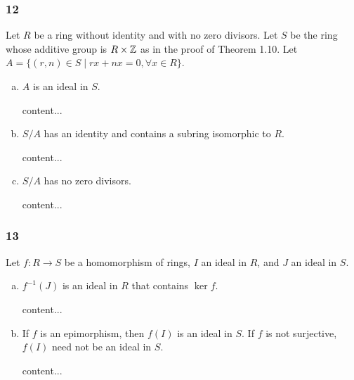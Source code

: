 \subsubsection*{12}
\begin{graybox}
	Let $R$ be a ring without identity and with no zero divisors. Let $S$ be the ring whose additive group is $R \times \mathbb{Z}$ as in the proof of Theorem 1.10. Let $A = \{(r,n) \in S \mid rx + nx = 0, \forall x \in R\}$.
\end{graybox}
\begin{enumerate}[(a)]
	\item
	\begin{lightgraybox}
		$A$ is an ideal in $S$.
	\end{lightgraybox}
	\begin{solution}
		content...
	\end{solution}
	
	\item
	\begin{lightgraybox}
		$S / A$ has an identity and contains a subring isomorphic to $R$.
	\end{lightgraybox}
	\begin{solution}
		content...
	\end{solution}
	
	\item
	\begin{lightgraybox}
		$S / A$ has no zero divisors. 
	\end{lightgraybox}
	\begin{solution}
		content...
	\end{solution}
\end{enumerate}

\subsubsection*{13}
\begin{graybox}
	Let $f : R \to S$ be a homomorphism of rings, $I$ an ideal in $R$, and $J$ an ideal in $S$.
\end{graybox}
\begin{enumerate}[(a)]
	\item 
	\begin{lightgraybox}
		$f^{-1}(J)$ is an ideal in $R$ that contains $\ker f$.
	\end{lightgraybox}
	\begin{solution}
		content...
	\end{solution}
	
	\item
	\begin{lightgraybox}
		If $f$ is an epimorphism, then $f(I)$ is an ideal in $S$. If $f$ is not surjective, $f(I)$ need not be an ideal in $S$.
	\end{lightgraybox}
	\begin{solution}
		content...
	\end{solution}
\end{enumerate}

